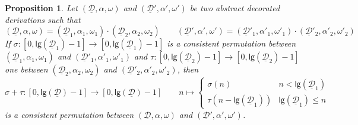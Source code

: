 \documentclass[a4paper]{article}
\newcommand{\dder}[1]{\mathscr{#1}}
\newcommand{\der}[1]{\underline{\dder{#1}}}
\newcommand{\lgh}[0]{\mathsf{lg}}
\newtheorem{proposition}[theorem]{Proposition}
\theoremstyle{definition}
\begin{document}
\begin{proposition}\label{prop:sum} Let $(\der{D}, \alpha, \omega)$ and $(\der{D}', \alpha', \omega')$ be two abstract decorated derivations such that
	\[(\der{D}, \alpha, \omega)=(\der{D}_1, \alpha_1, \omega_1)\cdot (\der{D}_2, \alpha_2, \omega_2) \qquad (\der{D}', \alpha', \omega')=(\der{D}'_1, \alpha'_1, \omega'_1)\cdot (\der{D}'_2, \alpha'_2, \omega'_2)\]
	If $\sigma\colon [0, \lgh(\der{D}_1)-1]\to [0, \lgh(\der{D}_1)-1]$ is a consistent permutation between  $(\der{D}_1, \alpha_1, \omega_1)$ and $(\der{D}'_1, \alpha'_1, \omega'_1)$ and $\tau:[0, \lgh(\der{D}_2)-1]\to [0, \lgh(\der{D}_2)-1]$ one between $(\der{D}_2, \alpha_2, \omega_2)$ and $(\der{D}'_2, \alpha'_2, \omega'_2)$, then 
	\[\sigma+\tau\colon[0, \lgh(\der{D})-1]\to[0, \lgh(\der{D})-1] \qquad n \mapsto \begin{cases}
		\sigma(n) & n < \lgh(\der{D}_1)\\
		\tau(n-\lgh(\der{D}_1)) &   \lgh(\der{D}_1) \leq n
	\end{cases}\]
	is a consistent permutation between $(\der{D}, \alpha, \omega)$ and $(\der{D}', \alpha', \omega')$.
\end{proposition}
\end{document}
